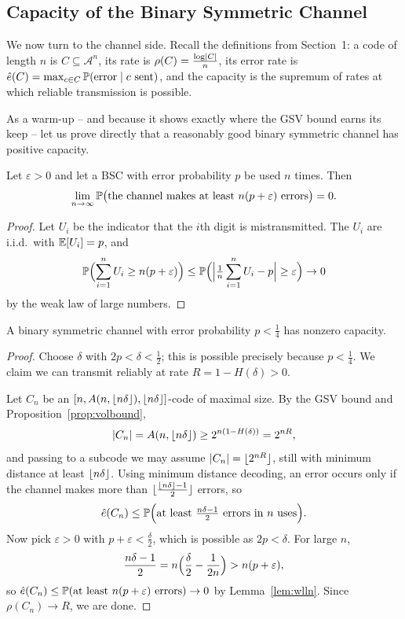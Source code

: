 \documentclass[a4paper]{scrartcl}
\DeclarePairedDelimiter{\floor}{\lfloor}{\rfloor}
\newcommand{\Ac}{\mathcal{A}}
\begin{document}
\subsection{Capacity of the Binary Symmetric Channel}

We now turn to the channel side. Recall the definitions from Section~1: a code of length $n$ is $C \subseteq \Ac^n$, its rate is $\rho(C) = \frac{\log\lvert C\rvert}{n}$, its error rate is $\hat e(C) = \max_{c \in C}\mathbb{P}(\text{error}\mid c \text{ sent})$, and the capacity is the supremum of rates at which reliable transmission is possible.

As a warm-up -- and because it shows exactly where the GSV bound earns its keep -- let us prove directly that a reasonably good binary symmetric channel has positive capacity.

\begin{lemma}\label{lem:wlln}
	Let $\varepsilon>0$ and let a BSC with error probability $p$ be used $n$ times. Then
	$$\lim_{n\to\infty}\mathbb{P}\bigl(\text{the channel makes at least } n(p+\varepsilon) \text{ errors}\bigr) = 0.$$
\end{lemma}

\begin{proof}
	Let $U_i$ be the indicator that the $i$th digit is mistransmitted. The $U_i$ are i.i.d.\ with $\mathbb{E}[U_i] = p$, and
	$$\mathbb{P}\Bigl(\sum_{i=1}^n U_i \ge n(p+\varepsilon)\Bigr) \le \mathbb{P}\Bigl(\Bigl\lvert\tfrac1n\sum_{i=1}^n U_i - p\Bigr\rvert \ge \varepsilon\Bigr) \to 0$$
	by the weak law of large numbers.
\end{proof}

\begin{proposition}
	A binary symmetric channel with error probability $p < \tfrac14$ has nonzero capacity.
\end{proposition}

\begin{proof}
	Choose $\delta$ with $2p < \delta < \tfrac12$; this is possible precisely because $p< \tfrac14$. We claim we can transmit reliably at rate $R = 1-H(\delta) > 0$.

	Let $C_n$ be an $[n, A(n,\floor{n\delta}), \floor{n\delta}]$-code of maximal size. By the GSV bound and Proposition~\ref{prop:volbound},
	$$\abs{C_n} = A(n,\floor{n\delta}) \ge 2^{n(1-H(\delta))} = 2^{nR},$$
	and passing to a subcode we may assume $\abs{C_n} = \floor{2^{nR}}$, still with minimum distance at least $\floor{n\delta}$. Using minimum distance decoding, an error occurs only if the channel makes more than $\floor{\frac{\floor{n\delta}-1}{2}}$ errors, so
	$$\hat e(C_n) \le \mathbb{P}\Bigl(\text{at least } \tfrac{n\delta-1}{2} \text{ errors in } n \text{ uses}\Bigr).$$
	Now pick $\varepsilon>0$ with $p+\varepsilon < \frac{\delta}{2}$, which is possible as $2p<\delta$. For large $n$,
	$$\frac{n\delta-1}{2} = n\Bigl(\frac{\delta}{2}-\frac{1}{2n}\Bigr) > n(p+\varepsilon),$$
	so $\hat e(C_n) \le \mathbb{P}(\text{at least } n(p+\varepsilon) \text{ errors})\to 0$ by Lemma~\ref{lem:wlln}. Since $\rho(C_n)\to R$, we are done.
\end{proof}
\end{document}
